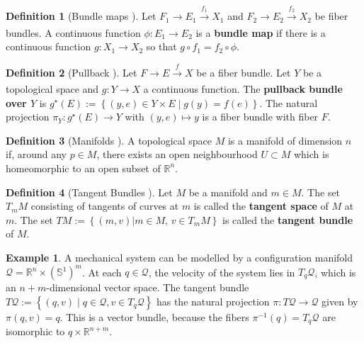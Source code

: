 \documentclass[12pt]{article}
\theoremstyle{definition}
\newtheorem{defn}{Definition}
\newtheorem{example}{Example}
\begin{document}
\begin{defn}[Bundle maps \cite{topology-fiber-bundles}]
    Let \(F_1 \rightarrow E_1 \xrightarrow[]{f_1} X_1\) and 
    \(F_2 \rightarrow E_2 \xrightarrow[]{f_2} X_2\) be fiber bundles. A
    continuous function \(\phi : E_1 \rightarrow E_2\) is a \textbf{bundle map}
    if there is a continuous function \(g : X_1 \rightarrow X_2\) so that
    \(g \circ f_1 = f_2 \circ \phi\).
\end{defn}

\begin{defn}[Pullback \cite{topology-fiber-bundles}]
    Let \(F \rightarrow E \xrightarrow[]{f} X\) be a fiber bundle. Let \(Y\) be
    a topological space and \(g : Y \rightarrow X\) a continuous function. The
    \textbf{pullback bundle over \(Y\)} is 
    \(g^\star(E) := \left\{ (y,e)\in Y \times E \mid g(y) = f(e)\right\}\). The
    natural projection \(\pi_Y : g^\star(E) \rightarrow Y\) with 
    \((y,e) \mapsto y\) is a fiber bundle with fiber \(F\).
\end{defn}

\begin{defn}[Manifolds \cite{intro-top-manifolds}]
    A topological space \(M\) is a manifold of dimension \(n\) if, around any
    \(p \in M\), there exists an open neighbourhood \(U \subset M\) 
    which is homeomorphic to an open subset of \(\mathbb{R}^n\).
\end{defn}

\begin{defn}[Tangent Bundles \cite{geometric-control}]
    Let \(M\) be a manifold and \(m \in M\). The set \(T_mM\) consisting of
    tangents of curves at \(m\) is called the \textbf{tangent space} of \(M\) at
    \(m\). The set \(TM := \left\{(m,v) | m \in M,\, v \in T_mM\right\}\) is
    called the \textbf{tangent bundle} of \(M\).
\end{defn}

\begin{example}\label{ex:tangent-bundle}
    A mechanical system can be modelled by a configuration manifold
    \(\mathcal{Q} = \mathbb{R}^n \times (\mathbb{S}^1)^m\). At each
    \(q \in \mathcal{Q}\), the velocity of the system lies in
    \(T_q\mathcal{Q}\), which is an \(n+m\)-dimensional vector
    space. 
    The tangent bundle
    \(T\mathcal{Q} := \left\{(q,v) \mid q \in \mathcal{Q}, v \in
    T_q\mathcal{Q}\right\}\)  has the natural
    projection \(\pi : T\mathcal{Q} \rightarrow \mathcal{Q}\) given by 
    \(\pi(q,v) = q\). This is a vector bundle, because the fibers 
    \(\pi^{-1}(q) = T_q\mathcal{Q}\) are isomorphic to 
    \({q} \times \mathbb{R}^{n+m}\).
\end{example}
\end{document}
